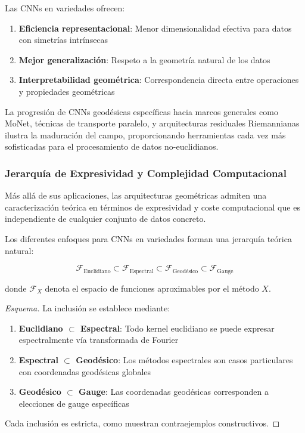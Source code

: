\begin{remark}\label{rem:ventajas_computacionales_riemannianas}
Las CNNs en variedades ofrecen:
\begin{enumerate}
	\item \textbf{Eficiencia representacional}: Menor dimensionalidad efectiva para datos con simetrías intrínsecas
	\item \textbf{Mejor generalización}: Respeto a la geometría natural de los datos
	\item \textbf{Interpretabilidad geométrica}: Correspondencia directa entre operaciones y propiedades geométricas
\end{enumerate}
\end{remark}

La progresión de CNNs geodésicas específicas hacia marcos generales como MoNet, técnicas de transporte paralelo, y arquitecturas residuales Riemannianas ilustra la maduración del campo, proporcionando herramientas cada vez más sofisticadas para el procesamiento de datos no-euclidianos.

\subsubsection{Jerarquía de Expresividad y Complejidad Computacional}

Más allá de sus aplicaciones, las arquitecturas geométricas admiten una caracterización teórica en términos de expresividad y coste computacional que es independiente de cualquier conjunto de datos concreto.

\begin{theorem}
Los diferentes enfoques para CNNs en variedades forman una jerarquía teórica natural:

\begin{equation}
\mathcal{F}_{\text{Euclidiano}} \subset \mathcal{F}_{\text{Espectral}} \subset \mathcal{F}_{\text{Geodésico}} \subset \mathcal{F}_{\text{Gauge}}
\end{equation}

donde $\mathcal{F}_X$ denota el espacio de funciones aproximables por el método $X$.
\end{theorem}

\begin{proof}[Esquema]
La inclusión se establece mediante:
\begin{enumerate}
    \item \textbf{Euclidiano $\subset$ Espectral}: Todo kernel euclidiano se puede expresar espectralmente vía transformada de Fourier
    \item \textbf{Espectral $\subset$ Geodésico}: Los métodos espectrales son casos particulares con coordenadas geodésicas globales
    \item \textbf{Geodésico $\subset$ Gauge}: Las coordenadas geodésicas corresponden a elecciones de gauge específicas
\end{enumerate}
Cada inclusión es estricta, como muestran contraejemplos constructivos.
\end{proof}


